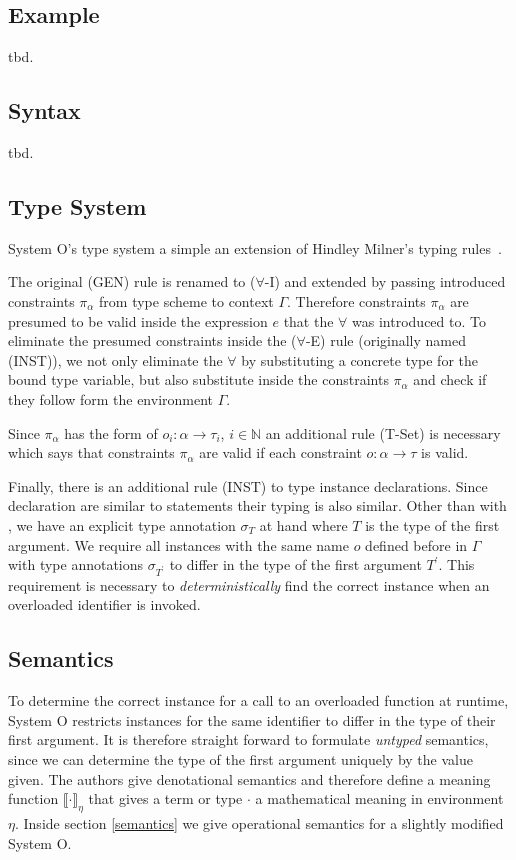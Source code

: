 \documentclass[runningheads]{llncs}
\newcommand{\snip}[1]{\footnotesize{\ttfamily{#1}}}
\begin{document}
\subsection{Example}
tbd.

\subsection{Syntax}
tbd.
\subsection{Type System}
System O's type system a simple an extension of Hindley Milner's typing rules~\cite{dm82}. 

The original (GEN) rule is renamed to ($\forall$-I) and extended by passing introduced constraints $\pi_\alpha$ from type scheme to context $\Gamma$. Therefore constraints $\pi_\alpha$ are presumed to be valid inside the expression $e$ that the $\forall$ was introduced to. To eliminate the presumed constraints inside the ($\forall$-E) rule (originally named (INST)), we not only eliminate the $\forall$ by substituting a concrete type for the bound type variable, but also substitute inside the constraints $\pi_\alpha$ and check if they follow form the environment $\Gamma$. 

Since $\pi_\alpha$ has the form of $o_i : \alpha \rightarrow \tau_i$, $i \in \mathbb{N}$ an additional rule (T-Set) is necessary which says that constraints $\pi_\alpha$ are valid if each constraint $o: \alpha \rightarrow \tau$ is valid.

Finally, there is an additional rule (INST) to type instance declarations. Since \snip{inst} declaration are similar to \snip{let} statements their typing is also similar. Other than with \snip{let}, we have an explicit type annotation $\sigma_T$ at hand where $T$ is the type of the first argument. We require all instances with the same name $o$ defined before in $\Gamma$ with type annotations $\sigma_{T^\prime}$ to differ in the type of the first argument $T^\prime$. This requirement is necessary to \emph{deterministically} find the correct instance when an overloaded identifier is invoked.
\subsection{Semantics}
To determine the correct instance for a call to an overloaded function at runtime, System O restricts instances for the same identifier to differ in the type of their first argument. It is therefore straight forward to formulate \emph{untyped} semantics, since we can determine the type of the first argument uniquely by the value given. The authors give denotational semantics and therefore define a meaning function $\llbracket \cdot \rrbracket_\eta$ that gives a term or type $\cdot$ a mathematical meaning in environment $\eta$. Inside section \ref{semantics} we give operational semantics for a slightly modified System O. 
\end{document}
